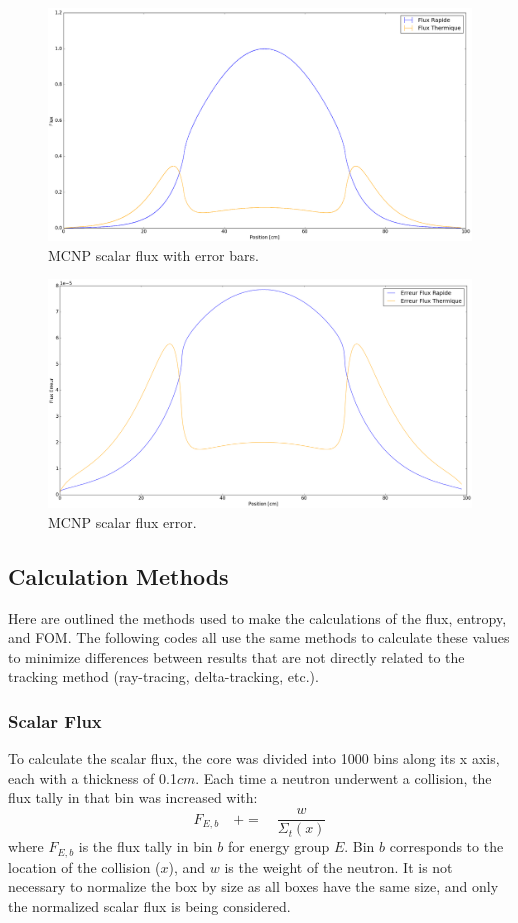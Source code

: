 \documentclass{article}
\begin{document}
		\begin{figure}
			\centering
			\includegraphics[scale=0.35]{mcnp_flux.png}
			\caption{MCNP scalar flux with error bars.}
			\label{fig:mcnp_flux}
		\end{figure}
	
		\begin{figure}
			\centering
			\includegraphics[scale=0.35]{mcnp_flux_erreur.png}
			\caption{MCNP scalar flux error.}
			\label{fig:mcnp_flux_erreur}
		\end{figure}
	
		\subsection{Calculation Methods}
			Here are outlined the methods used to make the calculations of the flux, entropy, and FOM. The following codes all use the same methods to calculate these values to minimize differences between results that are not directly related to the tracking method (ray-tracing, delta-tracking, etc.).
			\subsubsection{Scalar Flux}
			To calculate the scalar flux, the core was divided into 1000 bins along its x axis, each with a thickness of 0.1$cm$. Each time a neutron underwent a collision, the flux tally in that bin was increased with: 
			\begin{equation}
				F_{E,b} \quad += \quad \frac{w}{\Sigma_t(x)}
			\end{equation}
			where $F_{E,b}$ is the flux tally in bin $b$ for energy group $E$. Bin $b$ corresponds to the location of the collision ($x$), and $w$ is the weight of the neutron. It is not necessary to normalize the box by size as all boxes have the same size, and only the normalized scalar flux is being considered. 
			
\end{document}
